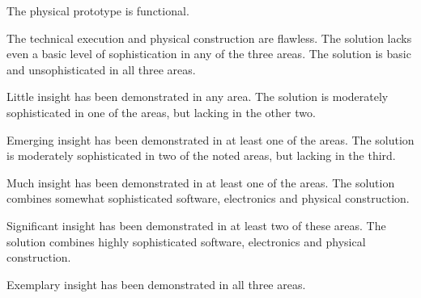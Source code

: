 \documentclass{../fal_assignment}
\begin{document}
\begin{markingrubric}
        \grade The physical prototype is functional.
            \par The technical execution and physical construction are flawless.
        \grade\fail The solution lacks even a basic level of sophistication in any of the three areas.
        \grade The solution is basic and unsophisticated in all three areas.
            \par Little insight has been demonstrated in any area.
        \grade The solution is moderately sophisticated in one of the areas, but lacking in the other two.
            \par Emerging insight has been demonstrated in at least one of the areas.
        \grade The solution is moderately sophisticated in two of the noted areas, but lacking in the third.
            \par Much insight has been demonstrated in at least one of the areas.
        \grade The solution combines somewhat sophisticated software, electronics and physical construction.
            \par Significant insight has been demonstrated in at least two of these areas.
        \grade The solution combines highly sophisticated software, electronics and physical construction.
            \par Exemplary insight has been demonstrated in all three areas.

\end{markingrubric}
\end{document}
